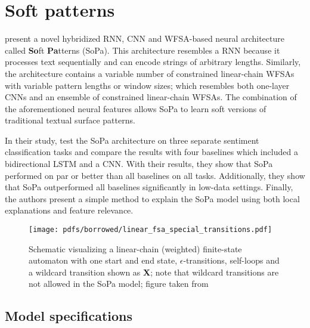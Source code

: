 \section{Soft patterns}

\label{section:soft-patterns}

\citet{schwartz2018sopa} present a novel hybridized RNN, CNN and WFSA-based neural architecture called \textbf{So}ft \textbf{Pa}tterns (SoPa). This architecture resembles a RNN because it processes text sequentially and can encode strings of arbitrary lengths. Similarly, the architecture contains a variable number of constrained linear-chain WFSAs with variable pattern lengths or window sizes; which resembles both one-layer CNNs and an ensemble of constrained linear-chain WFSAs. The combination of the aforementioned neural features allows SoPa to learn soft versions of traditional textual surface patterns.

In their study, \citet{schwartz2018sopa} test the SoPa architecture on three separate sentiment classification tasks and compare the results with four baselines which included a bidirectional LSTM and a CNN. With their results, they show that SoPa performed on par or better than all baselines on all tasks. Additionally, they show that SoPa outperformed all baselines significantly in low-data settings. Finally, the authors present a simple method to explain the SoPa model using both local explanations and feature relevance.

\begin{figure}[t]
  \centering
  \texttt{[image: pdfs/borrowed/linear\_fsa\_special\_transitions.pdf]}
  \caption{Schematic visualizing a linear-chain (weighted) finite-state automaton with one start and end state, $\epsilon$-transitions, self-loops and a wildcard transition shown as \textbf{X}; note that wildcard transitions are not allowed in the SoPa model; figure taken from \citet{schwartz2018sopa}}
  \label{fig:fsa}
\end{figure}

\subsection{Model specifications}

